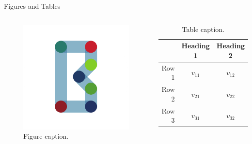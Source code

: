 \documentclass{beamer}
\begin{document}
    \begin{frame}{Figures and Tables}
        \begin{columns}
                \begin{figure}
                    \centering
                    \includegraphics[width=\linewidth]{images/logos/bse_round.png}
                    \caption{Figure caption.}
                    \label{fig:bse_logo}
                \end{figure}
                
                \begin{table}
                    \centering
                    \begin{tabular}{rcc}
                    	\toprule
                         & Heading 1 & Heading 2 \\
                        \toprule
                        Row 1 & \(v_{11}\) & \(v_{12}\) \\
                        Row 2 & \(v_{21}\) & \(v_{22}\) \\
                        Row 3 & \(v_{31}\) & \(v_{32}\) \\
                        \bottomrule
                    \end{tabular}
                    \caption{Table caption.}
                    \label{tab:demo}
                \end{table}
        \end{columns}
    \end{frame}
    
\end{document}
